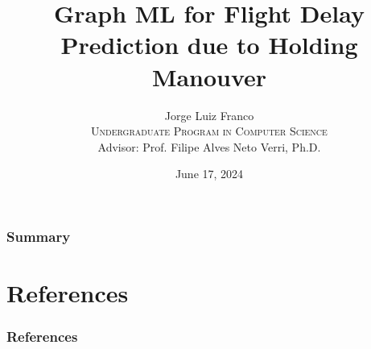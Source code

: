 \documentclass[aspectratio=169,dvipsnames]{beamer}
\title[Graph ML for Flight Delay Prediction due to Holding Manouver
]{Graph ML for Flight Delay Prediction due to Holding Manouver
}
\author[Jorge Luiz Franco]{Jorge Luiz Franco\\ \bigskip
\textsc{Undergraduate Program in Computer Science}\\ \bigskip
Advisor: Prof. Filipe Alves Neto Verri, Ph.D.}
\institute[ICMC/USP]{Universidade de São Paulo - ICMC}
\date[2024]{\footnotesize{June 17, 2024}}
\begin{document}
    
    \begin{frame}[plain]
        \titlepage
    \end{frame}
    
    \begin{frame}
      \frametitle{Summary}
      \tableofcontents
    \end{frame}
    














\section{References}

\begin{frame}[allowframebreaks]
  \frametitle{References}
  
  
  
\end{frame}
\end{document}
